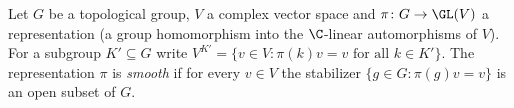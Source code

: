 Let $G$ be a topological group, $V$ a complex vector space and $\pi\colon G\to\GL(V)$ a representation (a group
homomorphism into the $\C$-linear automorphisms of $V$). For a subgroup $K'\subseteq G$ write
$V^{K'}=\{v\in V:\pi(k)v=v\text{ for all }k\in K'\}$. The representation $\pi$ is \emph{smooth} if for every
$v\in V$ the stabilizer $\{g\in G:\pi(g)v=v\}$ is an open subset of $G$.
